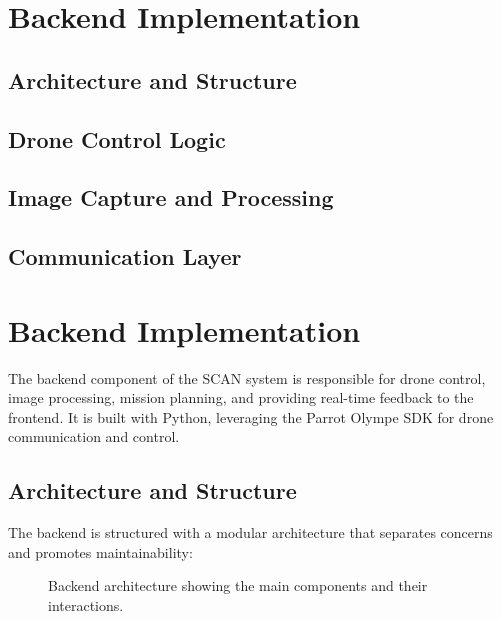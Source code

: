 \section{Backend Implementation}
    \subsection{Architecture and Structure}
    \subsection{Drone Control Logic}
    \subsection{Image Capture and Processing}
    \subsection{Communication Layer}

    \section{Backend Implementation}

    The backend component of the SCAN system is responsible for drone control, image processing, mission planning, and providing real-time feedback to the frontend. It is built with Python, leveraging the Parrot Olympe SDK for drone communication and control.
    
    \subsection{Architecture and Structure}
    
    The backend is structured with a modular architecture that separates concerns and promotes maintainability:
    
    \begin{figure}[H]
        \centering
        \caption{Backend architecture showing the main components and their interactions.}
        \label{fig:backend-architecture}
    \end{figure}
    
